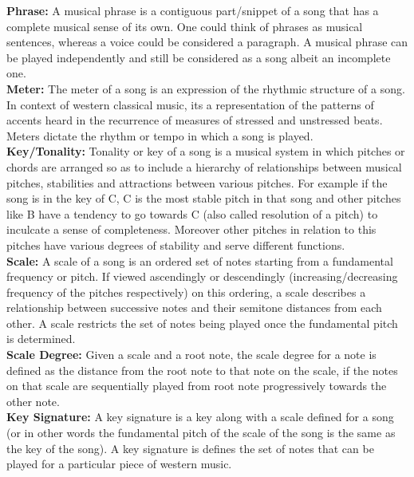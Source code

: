 \noindent \textbf{Phrase:} A musical phrase is a contiguous part/snippet of a song that has a complete musical sense of its own. One could think of phrases as musical sentences, whereas a voice could be considered a paragraph. A musical phrase can be played independently and still be considered as a song albeit an incomplete one. \\

\noindent \textbf{Meter:} The meter of a song is an expression of the rhythmic structure of a song. In context of western classical music, its a representation of the patterns of accents heard in the recurrence of measures of stressed and unstressed beats. Meters dictate the rhythm or tempo in which a song is played. \\

\noindent \textbf{Key/Tonality:} Tonality or key of a song is a musical system in which pitches or chords are arranged so as to include a hierarchy of relationships between musical pitches, stabilities and attractions between various pitches. For example if the song is in the key of C, C is the most stable pitch in that song and other pitches like B have a tendency to go towards C (also called resolution of a pitch) to inculcate a sense of completeness. Moreover other pitches in relation to this pitches have various degrees of stability and serve different functions. \\

\noindent \textbf{Scale:} A scale of a song is an ordered set of notes starting from a fundamental frequency or pitch. If viewed ascendingly or descendingly (increasing/decreasing frequency of the pitches respectively) on this ordering, a scale describes a relationship between successive notes and their semitone distances from each other. A scale restricts the set of notes being played once the fundamental pitch is determined. \\

\noindent \textbf{Scale Degree:} Given a scale and a root note, the scale degree for a note is defined as the distance from the root note to that note on the scale, if the notes on that scale are sequentially played from root note progressively towards the other note. \\

\noindent \textbf{Key Signature:} A key signature is a key along with a scale defined for a song (or in other words the fundamental pitch of the scale of the song is the same as the key of the song). A key signature is defines the set of notes that can be played for a particular piece of western music. \\

